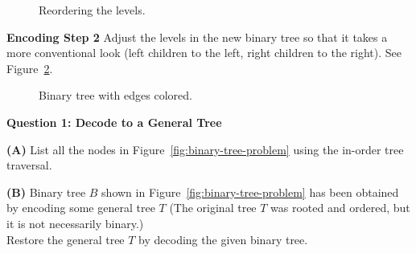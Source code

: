 \documentclass[a4paper,12pt]{article}
\begin{document}
\begin{figure}[!htb]
\caption{\label{fig:colored-binary-tree1-reordered} Reordering the levels.}
\end{figure}

{\bf Encoding Step 2} Adjust the levels in the new binary tree so that it takes 
a more conventional look (left children to the left, right children to the right).
See Figure~\ref{fig:colored-binary-tree1}.

\begin{figure}[!htb]
\caption{\label{fig:colored-binary-tree1} Binary tree with edges colored.}
\end{figure}




\vspace{10pt}
{\bf Question 1: Decode to a General Tree}

\vspace{5pt}
{\bf (A)} List all the nodes in Figure~\ref{fig:binary-tree-problem} 
using the in-order tree traversal.

\vspace{5pt}
{\bf (B)} Binary tree $B$ shown in Figure~\ref{fig:binary-tree-problem} has 
been obtained by encoding some general tree $T$ (The 
original tree $T$ was rooted 
and ordered, but it is not necessarily binary.)\\
Restore the general tree $T$ by decoding the given binary tree.
\end{document}
